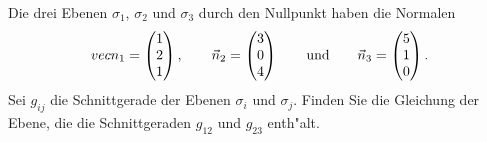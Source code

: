 Die drei Ebenen $\sigma_1$, $\sigma_2$ und $\sigma_3$ durch den Nullpunkt
haben die Normalen
\[
\\vec n_1=
\begin{pmatrix}1\\2\\1\end{pmatrix},
\qquad
\vec n_2=
\begin{pmatrix}3\\0\\4\end{pmatrix}
\qquad\text{und}\qquad
\vec n_3=
\begin{pmatrix}5\\1\\0\end{pmatrix}.
\]
Sei $g_{ij}$ die Schnittgerade der Ebenen $\sigma_i$ und $\sigma_j$.
Finden Sie die Gleichung der Ebene, die die Schnittgeraden $g_{12}$
und $g_{23}$ enth"alt.


